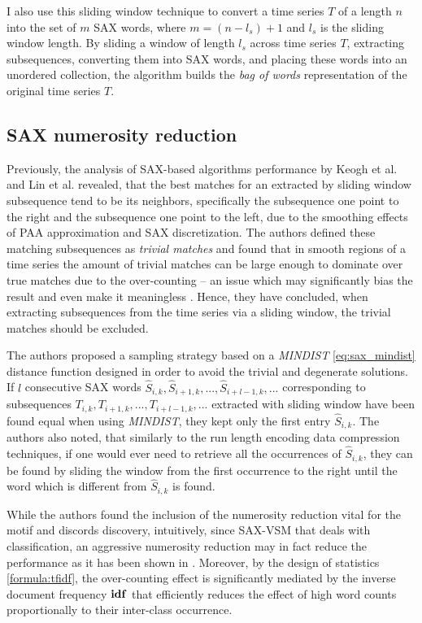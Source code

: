 I also use this sliding window technique to convert a time series $T$ of a length $n$ into 
the set of $m$ SAX words, where $m=(n-l_{s})+1$ and $l_{s}$ is the sliding window length. 
By sliding a window of length $l_{s}$ across time series $T$, extracting subsequences, 
converting them into SAX words, and placing these words into an unordered collection, 
the algorithm builds the \textit{bag of words} representation of the original time series $T$.

\subsection{SAX numerosity reduction}\label{section_numerosity_reduction}
Previously, the analysis of SAX-based algorithms performance by Keogh et al. \cite{citeulike:3977965} and 
Lin et al. \cite{citeulike:3175749} revealed, that the best matches for an extracted by sliding window 
subsequence tend to be its neighbors, specifically the subsequence one point to the right and the subsequence 
one point to the left, due to the smoothing effects of PAA approximation and SAX discretization. 
The authors defined these matching subsequences as \textit{trivial matches} and found that in smooth regions 
of a time series the amount of trivial matches can be large enough to dominate over true matches due to 
the over-counting -- an issue which may significantly bias the result and even make it meaningless \cite{citeulike:227029}. 
Hence, they have concluded, when extracting subsequences from the time series via a sliding window, 
the trivial matches should be excluded. 

The authors proposed a sampling strategy based on a \textit{MINDIST} \eqref{eq:sax_mindist} distance 
function designed in order to avoid the trivial and degenerate solutions.
If $l$ consecutive SAX words \newline $\widehat{S}_{i,k}, \widehat{S}_{i+1,k},...,\widehat{S}_{i+l-1,k},...$
corresponding to subsequences $T_{i,k}, T_{i+1,k},...,T_{i+l-1,k},...$ extracted with sliding window have been
found equal when using \textit{MINDIST}, they kept only the first entry $\widehat{S}_{i,k}$. 
The authors also noted, that similarly to the run length encoding data compression techniques, if one would ever need to 
retrieve all the occurrences of $\widehat{S}_{i,k}$, they can be found by sliding the window from 
the first occurrence to the right until the word which is different from $\widehat{S}_{i,k}$ is found. 

While the authors found the inclusion of the numerosity reduction vital for the motif and discords discovery, 
intuitively, since SAX-VSM that deals with classification, an aggressive numerosity reduction may 
in fact reduce the performance as it has been shown in \cite{citeulike:10525778}. 
Moreover, by the design of \tfidf statistics \eqref{formula:tfidf}, the over-counting effect is significantly mediated 
by the inverse document frequency $\text{\textbf{idf}}$ that efficiently reduces the effect of high word counts 
proportionally to their inter-class occurrence.

